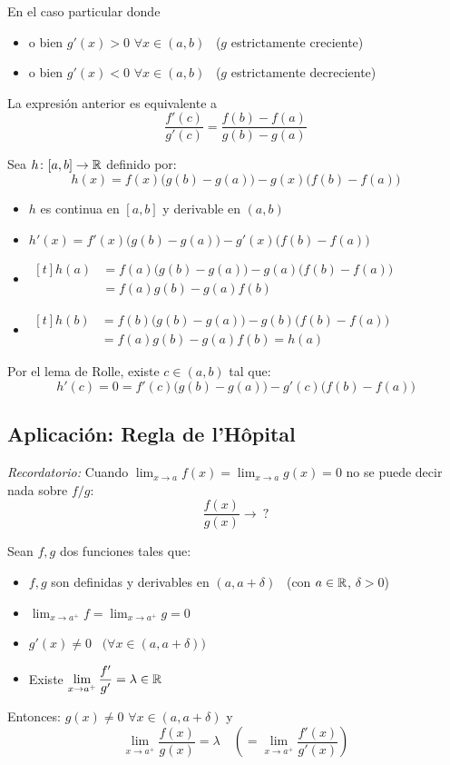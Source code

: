 \documentclass[11pt,a4paper]{article}
\begin{document}
\begin{observacion}
  En el caso particular donde
  \begin{itemize}
    \item[--] o bien $g'(x)>0$ $\forall x\in(a,b)$ \ ($g$ estrictamente creciente)
    \item[--] o bien $g'(x)<0$ $\forall x\in(a,b)$ \ ($g$ estrictamente decreciente)
  \end{itemize}
  La expresión anterior es equivalente a
  \[
    \frac{f'(c)}{g'(c)}=\frac{f(b)-f(a)}{g(b)-g(a)}
  \]
\end{observacion}

\begin{demo}
  Sea $h\colon[a,b]\to\mathbb{R}$ definido por:
  \[
    h(x)=f(x)\bigl(g(b)-g(a)\bigr)-g(x)\bigl(f(b)-f(a)\bigr)
  \]
  \begin{itemize}
    \item $h$ es continua en $[a,b]$ y derivable en $(a,b)$
    \item $h'(x)=f'(x)\bigl(g(b)-g(a)\bigr)-g'(x)\bigl(f(b)-f(a)\bigr)$
    \item $\begin{aligned}[t]
        h(a)&=f(a)\bigl(g(b)-g(a)\bigr)-g(a)\bigl(f(b)-f(a)\bigr)\\
        &=f(a)g(b)-g(a)f(b)
      \end{aligned}$
    \item $\begin{aligned}[t]
        h(b)&=f(b)\bigl(g(b)-g(a)\bigr)-g(b)\bigl(f(b)-f(a)\bigr)\\
        &=f(a)g(b)-g(a)f(b)=h(a)
      \end{aligned}$
  \end{itemize}
  Por el lema de Rolle, existe $c\in(a,b)$ tal que:
  \[
    h'(c)=0=f'(c)\bigl(g(b)-g(a)\bigr)-g'(c)\bigl(f(b)-f(a)\bigr)
  \]
\end{demo}

\subsection{Aplicación: Regla de l'Hôpital}

\textit{Recordatorio:} Cuando
$\displaystyle\lim_{x\to a}f(x)=\lim_{x\to a}g(x)=0$ no se puede decir
nada sobre $f/g$:
\[
  \frac{f(x)}{g(x)}\longrightarrow\ ?
\]

\begin{teorema}
  Sean $f,g$ dos funciones tales que:
  \begin{itemize}
    \item[--] $f,g$ son definidas y derivables en $(a,a+\delta)$
      \ (con $a\in\mathbb{R}$, $\delta>0$)
    \item[--] $\displaystyle\lim_{x\to a^+}f=\lim_{x\to a^+}g=0$
    \item[--] $g'(x)\neq 0$ \ $\bigl(\forall x\in(a,a+\delta)\bigr)$
    \item[--] Existe $\displaystyle\lim_{x\to a^+}\frac{f'}{g'}=\lambda\in\mathbb{R}$
  \end{itemize}
  Entonces: $g(x)\neq 0$ $\forall x\in(a,a+\delta)$ y
  \[
    \lim_{x\to a^+}\frac{f(x)}{g(x)}=\lambda
    \quad\left(=\lim_{x\to a^+}\frac{f'(x)}{g'(x)}\right)
  \]
\end{teorema}
\end{document}
